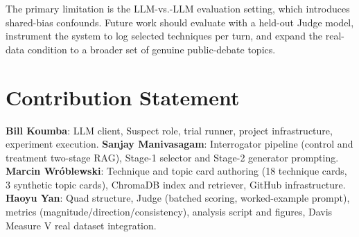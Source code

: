 \documentclass[sigconf]{acmart}
\begin{document}
The primary limitation is the LLM-vs.-LLM evaluation setting, which introduces
shared-bias confounds. Future work should evaluate with a held-out Judge model,
instrument the system to log selected techniques per turn, and expand the
real-data condition to a broader set of genuine public-debate topics.

\section{Contribution Statement}
\textbf{Bill Koumba}: LLM client, Suspect role, trial runner, project
infrastructure, experiment execution.
\textbf{Sanjay Manivasagam}: Interrogator pipeline (control and treatment
two-stage RAG), Stage-1 selector and Stage-2 generator prompting.
\textbf{Marcin Wróblewski}: Technique and topic card authoring (18 technique
cards, 3 synthetic topic cards), ChromaDB index and retriever, GitHub
infrastructure.
\textbf{Haoyu Yan}: Quad structure, Judge (batched scoring, worked-example
prompt), metrics (magnitude/direction/consistency), analysis script and figures,
Davis Measure V real dataset integration.
\end{document}
